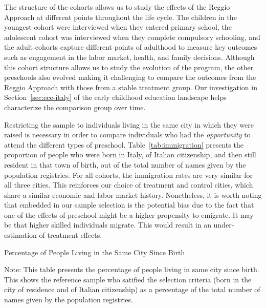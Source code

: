 The structure of the cohorts allows us to study the effects of the Reggio Approach at different points throughout the life cycle. The children in the youngest cohort were interviewed when they entered primary school, the adolescent cohort was interviewed when they complete compulsory schooling, and the adult cohorts capture different points of adulthood to measure key outcomes such as engagement in the labor market, health, and family decisions. Although this cohort structure allows us to study the evolution of the program, the other preschools also evolved making it challenging to compare the outcomes from the Reggio Approach with those from a stable treatment group. Our investigation in Section~\ref{sec:ece-italy} of the early childhood education landscape helps characterize the comparison group over time.

Restricting the sample to individuals living in the same city in which they were raised is necessary in order to compare individuals who had the \textit{opportunity} to attend the different types of preschool. Table~\ref{tab:immigration} presents the proportion of people who were born in Italy, of Italian citizenship, and then still resident in that town of birth, out of the total number of names given by the population registries. For all cohorts, the immigration rates are very similar for all three cities. This reinforces our choice of treatment and control cities, which share a similar economic and labor market history. Nonetheless, it is worth noting that embedded in our sample selection is the potential bias due to the fact that one of the effects of preschool might be a higher propensity to emigrate. It may be that higher skilled individuals migrate. This would result in an under-estimation of treatment effects.

\begin{table}[H]
\centering
\begin{threeparttable}
	\caption{Percentage of People Living in the Same City Since Birth}\label{tab:immigration}
	
\begin{tablenotes}
\footnotesize
Note: This table presents the percentage of people living in same city since birth. This  shows the reference sample who satified the selection criteria (born in the city of residence and of Italian citizenship) as a percentage of the total number of names given by the population registries.
\end{tablenotes}
\end{threeparttable}
\end{table}

